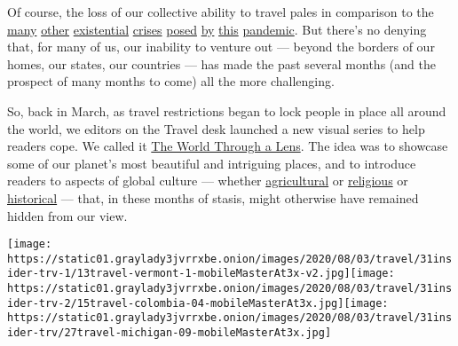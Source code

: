 Of course, the loss of our collective ability to travel pales in
comparison to the
\href{https://www.nytimes3xbfgragh.onion/interactive/2020/05/24/us/us-coronavirus-deaths-100000.html}{many}
\href{https://www.nytimes3xbfgragh.onion/interactive/2020/03/27/world/europe/coronavirus-italy-bergamo.html}{other}
\href{https://www.nytimes3xbfgragh.onion/2020/04/22/world/africa/coronavirus-hunger-crisis.html}{existential}
\href{https://www.nytimes3xbfgragh.onion/interactive/2020/world/coronavirus-health-care-workers.html}{crises}
\href{https://www.nytimes3xbfgragh.onion/2020/05/04/nyregion/coronavirus-nyc-burials-muslim.html}{posed}
\href{https://www.nytimes3xbfgragh.onion/2020/07/01/nyregion/Coronavirus-hospitals.html}{by}
\href{https://www.nytimes3xbfgragh.onion/2020/06/22/nyregion/nyc-evictions-moratorium-coronavirus.html}{this}
\href{https://www.nytimes3xbfgragh.onion/2020/07/23/business/economy/unemployment-economy-coronavirus.html}{pandemic}.
But there's no denying that, for many of us, our inability to venture
out --- beyond the borders of our homes, our states, our countries ---
has made the past several months (and the prospect of many months to
come) all the more challenging.

So, back in March, as travel restrictions began to lock people in place
all around the world, we editors on the Travel desk launched a new
visual series to help readers cope. We called it
\href{https://www.nytimes3xbfgragh.onion/column/the-world-through-a-lens}{The
World Through a Lens}. The idea was to showcase some of our planet's
most beautiful and intriguing places, and to introduce readers to
aspects of global culture --- whether
\href{https://www.nytimes3xbfgragh.onion/2020/05/12/travel/italy-saffron.html}{agricultural}
or
\href{https://www.nytimes3xbfgragh.onion/2020/04/22/travel/a-glimpse-inside-the-secluded-world-of-a-georgian-convent.html}{religious}
or
\href{https://www.nytimes3xbfgragh.onion/2020/04/15/travel/colombia-lost-city-ciudad-perdida.html}{historical}
--- that, in these months of stasis, might otherwise have remained
hidden from our view.

\texttt{[image: https://static01.graylady3jvrrxbe.onion/images/2020/08/03/travel/31insider-trv-1/13travel-vermont-1-mobileMasterAt3x-v2.jpg]}\texttt{[image: https://static01.graylady3jvrrxbe.onion/images/2020/08/03/travel/31insider-trv-2/15travel-colombia-04-mobileMasterAt3x.jpg]}\texttt{[image: https://static01.graylady3jvrrxbe.onion/images/2020/08/03/travel/31insider-trv/27travel-michigan-09-mobileMasterAt3x.jpg]}

